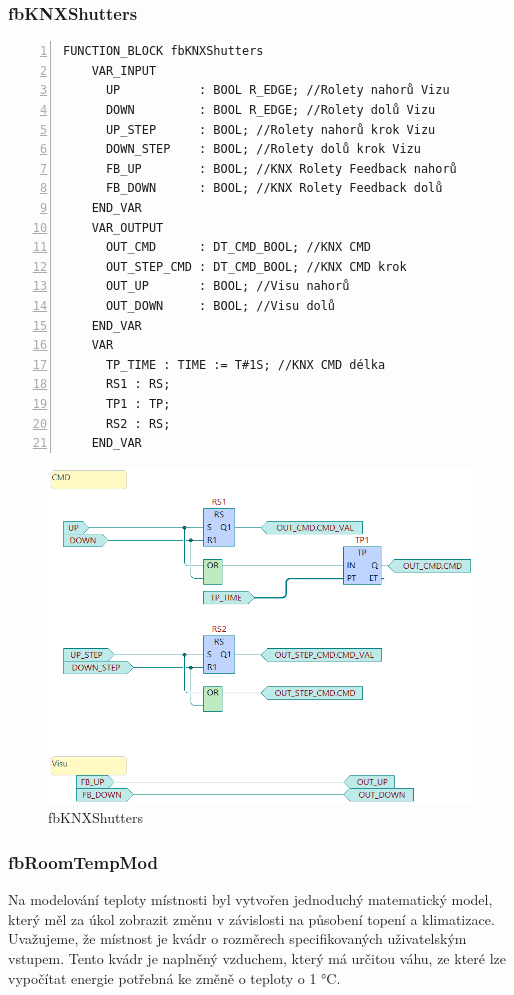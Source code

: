 \subsubsection{fbKNXShutters}
\begin{lstlisting}[language=ST, breaklines=true, numbers=left, numberstyle=\small, numbersep=10pt, frame=single, basicstyle=\ttfamily\small, caption={Definice funkčního bloku fbKNXShutters}, label={lst:fbKNXShutters}]
    FUNCTION_BLOCK fbKNXShutters
    VAR_INPUT
      UP           : BOOL R_EDGE; //Rolety nahorů Vizu
      DOWN         : BOOL R_EDGE; //Rolety dolů Vizu
      UP_STEP      : BOOL; //Rolety nahorů krok Vizu
      DOWN_STEP    : BOOL; //Rolety dolů krok Vizu
      FB_UP        : BOOL; //KNX Rolety Feedback nahorů
      FB_DOWN      : BOOL; //KNX Rolety Feedback dolů
    END_VAR
    VAR_OUTPUT
      OUT_CMD      : DT_CMD_BOOL; //KNX CMD
      OUT_STEP_CMD : DT_CMD_BOOL; //KNX CMD krok
      OUT_UP       : BOOL; //Visu nahorů
      OUT_DOWN     : BOOL; //Visu dolů
    END_VAR
    VAR
      TP_TIME : TIME := T#1S; //KNX CMD délka
      RS1 : RS;
      TP1 : TP;
      RS2 : RS;
    END_VAR
\end{lstlisting}

\begin{figure}[!ht]
    \begin{center}
        \includegraphics[scale=0.7]{obrazky/fbKNXShutters.png}
    \end{center}
    \caption[fbKNXShutters]{fbKNXShutters}
    \label{fig:fbKNXShutters}
\end{figure}
\subsubsection{fbRoomTempMod}
Na modelování teploty místnosti byl vytvořen jednoduchý matematický model, který měl za úkol zobrazit změnu v závislosti na působení topení a klimatizace.
Uvažujeme, že místnost je kvádr o rozměrech specifikovaných uživatelským vstupem. Tento kvádr je naplněný vzduchem, který má určitou váhu, ze které lze vypočítat energie potřebná ke změně o teploty o 1 °C.

